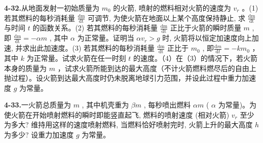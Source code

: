 \vfill

\textbf{4-32.}从地面发射一初始质量为 $m_0$ 的火箭, 喷射的燃料相对火箭的速度为 $v_r$ 。(1) 若其燃料的每秒消耗量 $\frac{\mathrm{dm}}{\mathrm{dt}}$ 可调节, 为使火箭在地面以上某个高度保持静止, 求 $\frac{\mathrm{dm}}{\mathrm{dt}}$ 与时间 $t$ 的函数关系。(2) 若其燃料的每秒消耗量 $\frac{\mathrm{dm}}{\mathrm{dt}}$ 正比于火箭的瞬时质量 $m$ , 即 $\frac{\mathrm{dm}}{\mathrm{dt}} = -\alpha m$ , 其中 $\alpha$ 为正常量。证明当 $\alpha v_r > g$ 时, 火箭将以恒定加速度向上加速, 并求出此加速度。(3) 若其燃料的每秒消耗量 $\frac{\mathrm{dm}}{\mathrm{dt}}$ 正比于 $m_0$ , 即$\frac{\mathrm{d}m}{\mathrm{d}t} = -km_0$ ，其中 $k$ 为正常量。试求火箭在任一时刻 $t$ 的速度。（4）在（3）的情况下，若火箭本身的质量为 $m$ ，试求火箭所能到达的最大高度（不计火箭燃料燃尽后的自由上抛过程）。设火箭到达最大高度时仍未脱离地球引力范围，并设此过程中重力加速度 $g$ 为常量。

\vfill
\newpage

\textbf{4-33.}一火箭总质量为 $m$ , 其中机壳重为 $\beta m$ , 每秒喷出燃料 $\alpha m$ ( $\alpha$ 为常量)。为使火箭在开始喷射燃料的瞬时即能竖直起飞, 燃料的喷射速度 (相对火箭) $v_{r}$ 至少为多大? 维持用这样的速度喷射燃料, 当燃料恰好喷射完时, 火箭上升的最大高度 $h$ 为多少? 设重力加速度 $g$ 为常量。

\vfill
\newpage